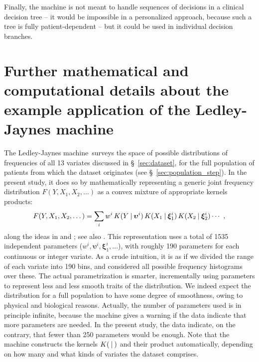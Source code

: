 \documentclass[utf8]{FrontiersinHarvard} %
\newcommand*{\sect}{\S}%
\newcommand*{\chap}{ch.}%
\renewcommand*{\|}[1][]{\nonscript\:#1\vert\nonscript\:\mathopen{}}
\newcommand*{\ljm}{Ledley-Jaynes machine}
\begin{document}
Finally, the machine is not meant to handle sequences of decisions in a clinical decision tree \citetext{\citealp[\chap~6]{soxetal1988_r2013}; \citealp[\chap~1]{huninketal2001_r2014}} -- it would be impossible in a personalized approach, because such a tree is fully patient-dependent -- but it could be used in individual decision branches.


\bigskip%
\appendix
\renewcommand\thesection{\Alph{section}}
\section{Further mathematical and computational details about the example application of the \ljm}
\label{sec:appendices}

The \ljm\ surveys the space of possible distributions of frequencies of all 13 variates discussed in \sect~\ref{sec:dataset}, for the full population of patients from which the dataset originates (see \sect~\ref{sec:population_step}). In the present study, it does so by mathematically representing a generic joint frequency distribution $F(Y,X_1,X_2,\dotsc)$ as a convex mixture of appropriate kernels products:
\begin{equation*}
F(Y,X_1,X_2,\dotsc) = \sum_i w^{i}\, K(Y\|\bm{\upsilon}^{i})\,
K(X_1\|\bm{\xi}_1^{i})\, K(X_2\|\bm{\xi}_2^{i})\dotsm\ ,
\end{equation*}
along the ideas in \citet{dunsonetal2011} and \citet{ishwaranetal2002b}; see also \citet{rossi2014,rasmussen1999}. This representation uses a total of 1535 independent parameters ($w^{i}, \bm{\upsilon}^{i}, \bm{\xi}^{i}_{1}, \dotsc$), with roughly 190 parameters for each continuous or integer variate. As a crude intuition, it is as if we divided the range of each variate into 190 bins, and considered all possible frequency histograms over these. The actual parametrization is smarter, incrementally using parameters to represent less and less smooth traits of the distribution. We indeed expect the distribution for a full population to have some degree of smoothness, owing to physical and biological reasons. Actually, the number of parameters used is in principle infinite, because the machine gives a warning if the data indicate that more parameters are needed. In the present study, the data indicate, on the contrary, that fewer than 250 parameters would be enough. Note that the machine constructs the kernels $K(\|)$ and their product automatically, depending on how many and what kinds of variates the dataset comprises.
\end{document}
